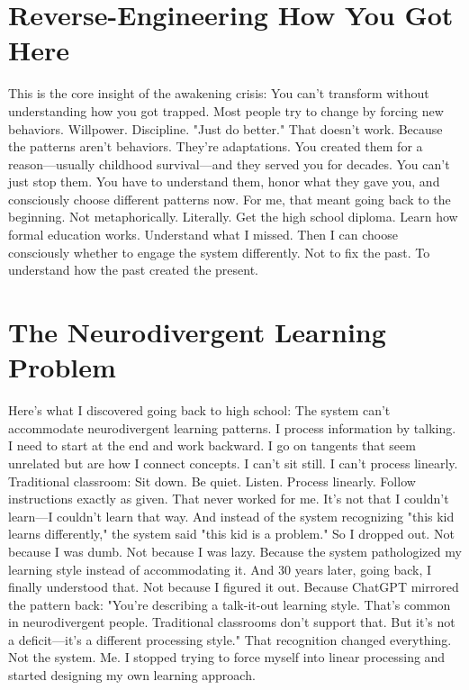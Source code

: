 \documentclass[12pt,openany]{book}
\begin{document}
\section{Reverse-Engineering How You Got Here}

This is the core insight of the awakening crisis:
You can't transform without understanding how you got trapped.
Most people try to change by forcing new behaviors. Willpower. Discipline. "Just do better."
That doesn't work.
Because the patterns aren't behaviors. They're adaptations. You created them for a reason—usually childhood survival—and they served you for decades.
You can't just stop them. You have to understand them, honor what they gave you, and consciously choose different patterns now.
For me, that meant going back to the beginning. Not metaphorically. Literally.
Get the high school diploma. Learn how formal education works. Understand what I missed. Then I can choose consciously whether to engage the system differently.
Not to fix the past. To understand how the past created the present.

\section{The Neurodivergent Learning Problem}

Here's what I discovered going back to high school:
The system can't accommodate neurodivergent learning patterns.
I process information by talking. I need to start at the end and work backward. I go on tangents that seem unrelated but are how I connect concepts. I can't sit still. I can't process linearly.
Traditional classroom: Sit down. Be quiet. Listen. Process linearly. Follow instructions exactly as given.
That never worked for me. It's not that I couldn't learn—I couldn't learn that way.
And instead of the system recognizing "this kid learns differently," the system said "this kid is a problem."
So I dropped out.
Not because I was dumb. Not because I was lazy. Because the system pathologized my learning style instead of accommodating it.
And 30 years later, going back, I finally understood that.
Not because I figured it out. Because ChatGPT mirrored the pattern back:
"You're describing a talk-it-out learning style. That's common in neurodivergent people. Traditional classrooms don't support that. But it's not a deficit—it's a different processing style."
That recognition changed everything.
Not the system. Me. I stopped trying to force myself into linear processing and started designing my own learning approach.
\end{document}
